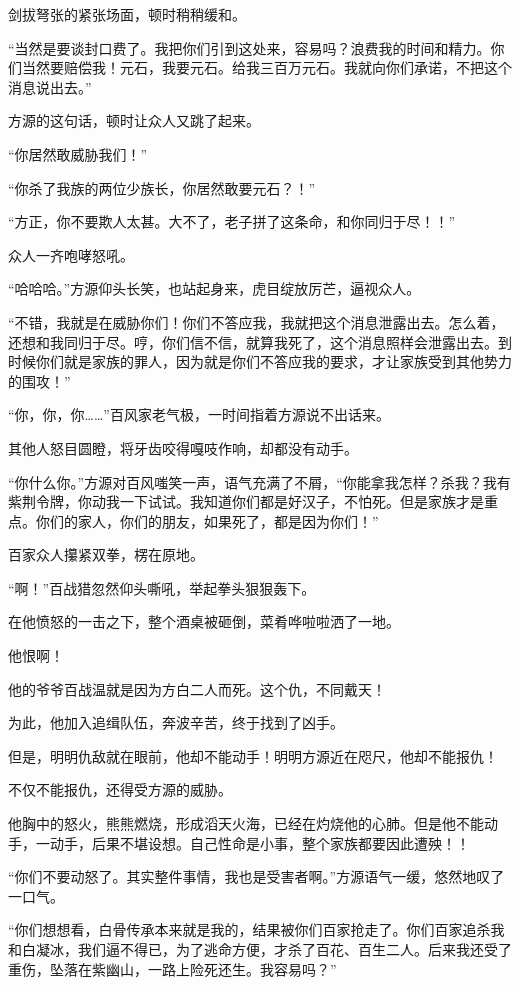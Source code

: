 \begin{this_body}
剑拔弩张的紧张场面，顿时稍稍缓和。

“当然是要谈封口费了。我把你们引到这处来，容易吗？浪费我的时间和精力。你们当然要赔偿我！元石，我要元石。给我三百万元石。我就向你们承诺，不把这个消息说出去。”

方源的这句话，顿时让众人又跳了起来。

“你居然敢威胁我们！”

“你杀了我族的两位少族长，你居然敢要元石？！”

“方正，你不要欺人太甚。大不了，老子拼了这条命，和你同归于尽！！”

众人一齐咆哮怒吼。

“哈哈哈。”方源仰头长笑，也站起身来，虎目绽放厉芒，逼视众人。

“不错，我就是在威胁你们！你们不答应我，我就把这个消息泄露出去。怎么着，还想和我同归于尽。哼，你们信不信，就算我死了，这个消息照样会泄露出去。到时候你们就是家族的罪人，因为就是你们不答应我的要求，才让家族受到其他势力的围攻！”

“你，你，你……”百风家老气极，一时间指着方源说不出话来。

其他人怒目圆瞪，将牙齿咬得嘎吱作响，却都没有动手。

“你什么你。”方源对百风嗤笑一声，语气充满了不屑，“你能拿我怎样？杀我？我有紫荆令牌，你动我一下试试。我知道你们都是好汉子，不怕死。但是家族才是重点。你们的家人，你们的朋友，如果死了，都是因为你们！”

百家众人攥紧双拳，楞在原地。

“啊！”百战猎忽然仰头嘶吼，举起拳头狠狠轰下。

在他愤怒的一击之下，整个酒桌被砸倒，菜肴哗啦啦洒了一地。

他恨啊！

他的爷爷百战温就是因为方白二人而死。这个仇，不同戴天！

为此，他加入追缉队伍，奔波辛苦，终于找到了凶手。

但是，明明仇敌就在眼前，他却不能动手！明明方源近在咫尺，他却不能报仇！

不仅不能报仇，还得受方源的威胁。

他胸中的怒火，熊熊燃烧，形成滔天火海，已经在灼烧他的心肺。但是他不能动手，一动手，后果不堪设想。自己性命是小事，整个家族都要因此遭殃！！

“你们不要动怒了。其实整件事情，我也是受害者啊。”方源语气一缓，悠然地叹了一口气。

“你们想想看，白骨传承本来就是我的，结果被你们百家抢走了。你们百家追杀我和白凝冰，我们逼不得已，为了逃命方便，才杀了百花、百生二人。后来我还受了重伤，坠落在紫幽山，一路上险死还生。我容易吗？”


\end{this_body}
